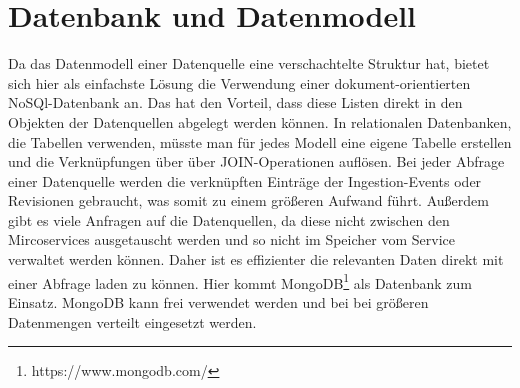 \section{Datenbank und Datenmodell}

Da das Datenmodell einer Datenquelle eine verschachtelte Struktur hat, bietet sich hier als einfachste Lösung die Verwendung einer dokument-orientierten NoSQl-Datenbank an.
Das hat den Vorteil, dass diese Listen direkt in den Objekten der Datenquellen abgelegt werden können.
In relationalen Datenbanken, die Tabellen verwenden, müsste man für jedes Modell eine eigene Tabelle erstellen und die Verknüpfungen über über JOIN-Operationen auflösen.
Bei jeder Abfrage einer Datenquelle werden die verknüpften Einträge der Ingestion-Events oder Revisionen gebraucht, was somit zu einem größeren Aufwand führt.
Außerdem gibt es viele Anfragen auf die Datenquellen, da diese nicht zwischen den Mircoservices ausgetauscht werden und so nicht im Speicher vom Service verwaltet werden können.
Daher ist es effizienter die relevanten Daten direkt mit einer Abfrage laden zu können.
Hier kommt MongoDB\footnote{https://www.mongodb.com/} als Datenbank zum Einsatz.
MongoDB kann frei verwendet werden und bei bei größeren Datenmengen verteilt eingesetzt werden.
